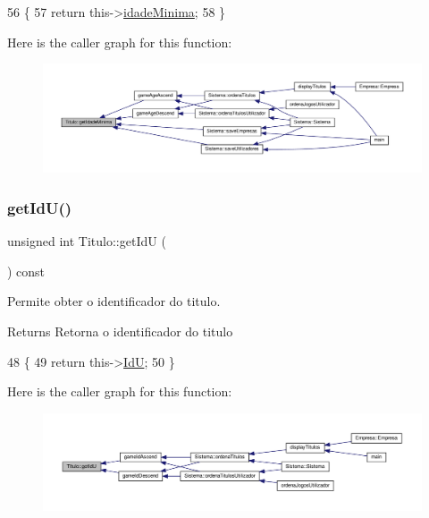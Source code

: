 \begin{DoxyCode}
56                                            \{
57         \textcolor{keywordflow}{return} this->\hyperlink{classTitulo_a28891078f53fc3317de60ae739514955}{idadeMinima};
58 \}
\end{DoxyCode}
Here is the caller graph for this function\+:
\nopagebreak
\begin{figure}[H]
\begin{center}
\leavevmode
\includegraphics[width=350pt]{classTitulo_a8048db7604abd58892122c810a6794be_icgraph}
\end{center}
\end{figure}
\mbox{\label{classTitulo_af8fed6503c1c528ac3bfdbb182fce0b6}} 
\subsubsection{\texorpdfstring{get\+Id\+U()}{getIdU()}}
{\footnotesize\ttfamily unsigned int Titulo\+::get\+IdU (\begin{DoxyParamCaption}{ }\end{DoxyParamCaption}) const}



Permite obter o identificador do titulo. 

\begin{DoxyReturn}{Returns}
Retorna o identificador do titulo 
\end{DoxyReturn}

\begin{DoxyCode}
48                                  \{
49         \textcolor{keywordflow}{return} this->\hyperlink{classTitulo_aff7d1cc9accbc0f49c05cdc97c66844c}{IdU};
50  \}
\end{DoxyCode}
Here is the caller graph for this function\+:
\nopagebreak
\begin{figure}[H]
\begin{center}
\leavevmode
\includegraphics[width=350pt]{classTitulo_af8fed6503c1c528ac3bfdbb182fce0b6_icgraph}
\end{center}
\end{figure}
\mbox{\label{classTitulo_acb79279860b3404c6419697df5f860cb}} 
